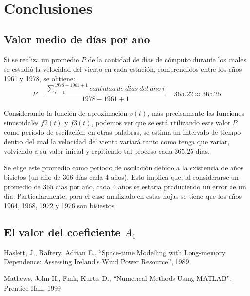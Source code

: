 \documentclass[journal, monochrome]{IEEEtran}
\begin{document}
\vspace{1cm}
\section{Conclusiones}
\label{section:conclusions}
\vspace{0.5cm}
\subsection{Valor medio de días por año}
Si se realiza un promedio $P$ de la cantidad de días de cómputo durante los cuales se estudió la velocidad del viento en cada
estación, comprendidos entre los años 1961 y 1978, se obtiene:
\begin{equation}
 P = \frac{\displaystyle\sum_{i=1}^{1978-1961+1} cantidad \: de \: d\acute{i}as \: del \: a\tilde{n}o \: i}{1978-1961+1} = 365.22 \approx 365.25
\end{equation}

Considerando la función de aproximación $v(t)$, más precisamente las funciones sinusoidales $f2(t)$ y $f3(t)$, podemos ver que se está utilizando
este valor $P$ como período de oscilación; en otras palabras, se estima un intervalo de tiempo dentro del cual la velocidad del viento variará tanto
como tenga que variar, volviendo a su valor inicial y repitiendo tal proceso cada $365.25$ días.

Se elige este promedio como período de oscilación debido a la existencia de años bisietos (un año de 366 días cada 4 años). Esto implica que, al considerarse un
promedio de 365 días por año, cada 4 años se estaría produciendo un error de un día. Particularmente, para el caso
analizado en estas hojas se tiene que los años 1964, 1968, 1972 y 1976 son bisiestos.

\vspace{0.5cm}
\subsection{El valor del coeficiente $A_{0}$}



\vspace{1cm}
\begin{thebibliography}{1}
	Haslett, J.,
	Raftery, Adrian E.,
	``Space-time Modelling with
   	Long-memory Dependence: Assessing Ireland's Wind Power Resource'',
	1989 

	Mathews, John H.,
	Fink, Kurtis D.,
	``Numerical Methods Using MATLAB'',
	Prentice Hall,
	1999
	
\end{thebibliography}
\end{document}

